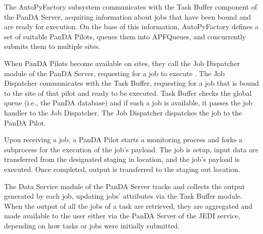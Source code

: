 The AutoPyFactory subsystem communicates with the Task Buffer component of the
PanDA Server, acquiring information about jobs that have been bound and are
ready for execution. On the base of this information, AutoPyFactory defines a
set of suitable PanDA Pilots, queues them into APFQueues, and concurrently
submits them to multiple sites.


When PanDA Pilots become available on sites, they
call the Job Dispatcher module of the PanDA Server, requesting for a job to
execute . The Job Dispatcher communicates with
the Task Buffer, requesting for a job that is bound to the site of that pilot
and ready to be executed. Task Buffer checks the global queue (i.e., the PanDA
database) and if such a job is available, it passes the job handler to the Job
Dispatcher. The Job Dispatcher dispatches the job to the PanDA Pilot.

Upon receiving a job, a PanDA Pilot starts a monitoring process and forks a
subprocess for the execution of the job's payload. The job is setup, input data
are transferred from the designated staging in location, and the job's payload
is executed. Once completed, output is transferred to the staging out location.

The Data Service module of the PanDA Server tracks and collects the output
generated by each job, updating jobs' attributes via the Task Buffer module.
When the output of all the jobs of a task are retrieved, they are aggregated and
made available to the user either via the PanDA Server of the JEDI service,
depending on how tasks or jobs were initially submitted.

